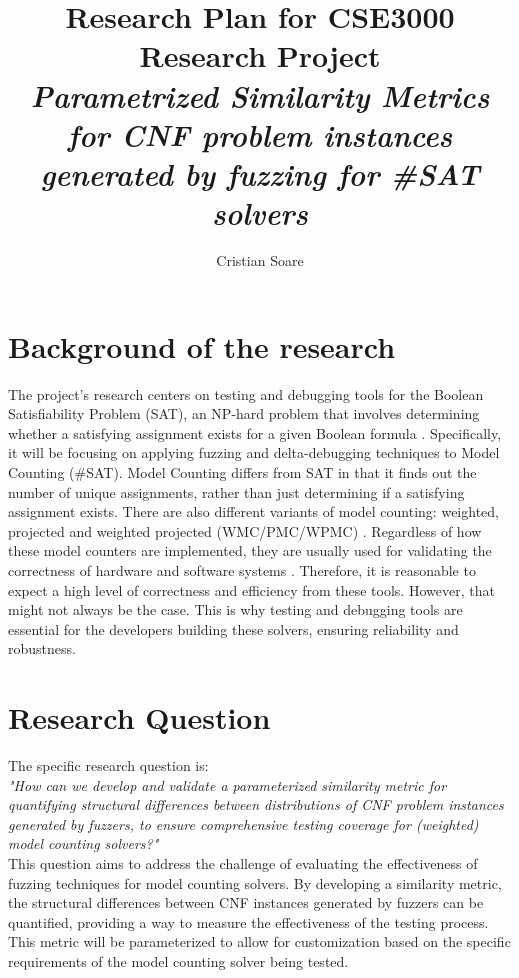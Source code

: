\documentclass[english, a4paper]{article}
\title{
    Research Plan for CSE3000 Research Project\\
        {\large \textit{Parametrized Similarity Metrics for CNF problem instances generated by fuzzing for \#SAT solvers}}
}
\author{Cristian Soare}
\begin{document}
\maketitle

\section*{Background of the research}

The project's research centers on testing and debugging tools for the Boolean Satisfiability Problem (SAT), an NP-hard problem that involves determining whether a satisfying assignment exists for a given Boolean formula \parencite{Biere2009}. Specifically, it will be focusing on applying fuzzing and delta-debugging \parencite{zellerYesterdayMyProgram1999} techniques to Model Counting (\#SAT). Model Counting differs from SAT in that it finds out the number of unique assignments, rather than just determining if a satisfying assignment exists. There are also different variants of model counting: weighted, projected and weighted projected (WMC/PMC/WPMC) \parencite{Biere2009}. Regardless of how these model counters are implemented, they are usually used for validating the correctness of hardware and software systems \parencite{Duenas2017,Latour2022,Baluta2019}. Therefore, it is reasonable to expect a high level of correctness and efficiency from these tools. However, that might not always be the case. This is why testing and debugging tools are essential for the developers building these solvers, ensuring reliability and robustness.

\section*{Research Question}

The specific research question is:\\

\textit{"How can we develop and validate a parameterized similarity metric for quantifying structural differences between distributions of CNF problem instances generated by fuzzers, to ensure comprehensive testing coverage for (weighted) model counting solvers?"}\\

This question aims to address the challenge of evaluating the effectiveness of fuzzing techniques for model counting solvers. By developing a similarity metric, the structural differences between CNF instances generated by fuzzers can be quantified, providing a way to measure the effectiveness of the testing process. This metric will be parameterized to allow for customization based on the specific requirements of the model counting solver being tested.\\
\end{document}
